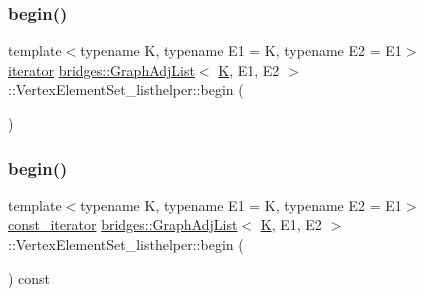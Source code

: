 \subsubsection{\texorpdfstring{begin()}{begin()}\hspace{0.1cm}{\footnotesize\ttfamily [1/2]}}
{\footnotesize\ttfamily template$<$typename K, typename E1 = K, typename E2 = E1$>$ \\
\mbox{\hyperlink{classbridges_1_1_graph_adj_list_1_1_vertex_element_set__listhelper_1_1iterator}{iterator}} \mbox{\hyperlink{classbridges_1_1_graph_adj_list}{bridges\+::\+Graph\+Adj\+List}}$<$ \mbox{\hyperlink{namespacebridges_acfb0a4f7877d8f63de3e6862004c50edaa5f3c6a11b03839d46af9fb43c97c188}{K}}, E1, E2 $>$\+::Vertex\+Element\+Set\+\_\+listhelper\+::begin (\begin{DoxyParamCaption}{ }\end{DoxyParamCaption})\hspace{0.3cm}{\ttfamily [inline]}}

\mbox{\label{classbridges_1_1_graph_adj_list_1_1_vertex_element_set__listhelper_a9021945bdb83e3735fbc9b9a42f39a39}} 
\subsubsection{\texorpdfstring{begin()}{begin()}\hspace{0.1cm}{\footnotesize\ttfamily [2/2]}}
{\footnotesize\ttfamily template$<$typename K, typename E1 = K, typename E2 = E1$>$ \\
\mbox{\hyperlink{classbridges_1_1_graph_adj_list_1_1_vertex_element_set__listhelper_1_1const__iterator}{const\+\_\+iterator}} \mbox{\hyperlink{classbridges_1_1_graph_adj_list}{bridges\+::\+Graph\+Adj\+List}}$<$ \mbox{\hyperlink{namespacebridges_acfb0a4f7877d8f63de3e6862004c50edaa5f3c6a11b03839d46af9fb43c97c188}{K}}, E1, E2 $>$\+::Vertex\+Element\+Set\+\_\+listhelper\+::begin (\begin{DoxyParamCaption}{ }\end{DoxyParamCaption}) const\hspace{0.3cm}{\ttfamily [inline]}}

